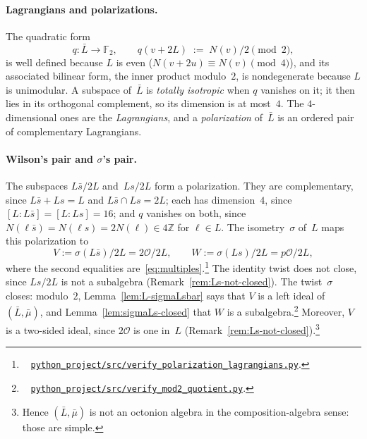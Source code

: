 \documentclass[twoside,english]{paper}
\numberwithin{equation}{section}
\numberwithin{figure}{section}
\theoremstyle{definition}
\theoremstyle{remark}
\newcommand{\MO}{\mathcal{O}}         %
\newcommand{\ZZ}{\mathbb{Z}}
\newcommand{\FF}{\mathbb{F}}
\newcommand{\Nrm}{N}                  %
\newcommand{\scriptref}[1]{\cite{repo}~%
  \href{https://github.com/koeplinger/leech\_alg/blob/main/python\_project/src/#1}%
  {\nolinkurl{python_project/src/#1}}}
\begin{document}
\paragraph{Lagrangians and polarizations.}
The quadratic form
\begin{equation}\label{eq:disp17}
  q \colon \bar L \to \FF_2, \qquad q(v + 2L) \;:=\; \Nrm(v)/2 \pmod 2,
\end{equation}
is well defined because $L$ is even ($\Nrm(v + 2u) \equiv \Nrm(v)
\pmod 4$), and its associated bilinear form, the inner product
modulo~$2$, is nondegenerate because $L$ is unimodular.  A subspace
of~$\bar L$ is \emph{totally isotropic} when $q$ vanishes on it; it
then lies in its orthogonal complement, so its dimension is at
most~$4$.  The $4$-dimensional ones are the \emph{Lagrangians}, and a
\emph{polarization} of~$\bar L$ is an ordered pair of complementary
Lagrangians.

\paragraph{Wilson's pair and $\sigma$'s pair.}
The subspaces $L\bar s/2L$ and~$Ls/2L$ form a polarization.  They are
complementary, since $L\bar s + Ls = L$ and $L\bar s \cap Ls = 2L$;
each has dimension~$4$, since $[L : L\bar s] = [L : Ls] = 16$; and $q$
vanishes on both, since $\Nrm(\ell\bar s) = \Nrm(\ell s) =
2\Nrm(\ell) \in 4\ZZ$ for $\ell \in L$.  The isometry~$\sigma$ of~$L$
maps this polarization to
\begin{equation}\label{eq:disp15}
  V := \sigma(L\bar s)/2L = 2\MO/2L, \qquad
  W := \sigma(Ls)/2L = p\MO/2L,
\end{equation}
where the second equalities are~\eqref{eq:multiples}.\footnote{\scriptref{verify\_polarization\_lagrangians.py}.}
The identity twist does not close, since $Ls/2L$ is not a subalgebra
(Remark~\ref{rem:Ls-not-closed}).  The twist~$\sigma$ closes:
modulo~$2$, Lemma~\ref{lem:L-sigmaLsbar} says that $V$ is a left ideal
of~$(\bar L, \bar\mu)$, and Lemma~\ref{lem:sigmaLs-closed} that $W$ is
a subalgebra.\footnote{\scriptref{verify\_mod2\_quotient.py}.}
Moreover, $V$ is a two-sided ideal, since $2\MO$ is one in~$L$
(Remark~\ref{rem:Ls-not-closed}).\footnote{Hence
$(\bar L, \bar\mu)$ is not an octonion algebra in the
composition-algebra sense: those are simple.}
\end{document}

